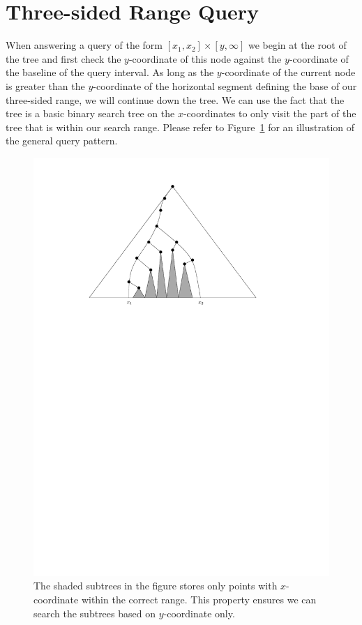 \documentclass[twoside,11pt,openright]{report}
\begin{document}
\section{Three-sided Range Query}
When answering a query of the form $[x_1,x_2] \times [y,\infty]$ we begin at the root of the tree and first check the $y$-coordinate of this node against the $y$-coordinate of the baseline of the query interval. As long as the $y$-coordinate of the current node is greater than the $y$-coordinate of the horizontal segment defining the base of our three-sided range, we will continue down the tree. We can use the fact that the tree is a basic binary search tree on the $x$-coordinates to only visit the part of the tree that is within our search range. Please refer to Figure~\ref{fig:static_pst_query} for an illustration of the general query pattern.

\begin{figure}[h]
	\centering
	\includegraphics[scale=0.7]{../figures/internal_pst_query}
	\caption{The shaded subtrees in the figure stores only points with $x$-coordinate within the correct range. This property ensures we can search the subtrees based on $y$-coordinate only.}
	\label{fig:static_pst_query}
\end{figure}
\end{document}
